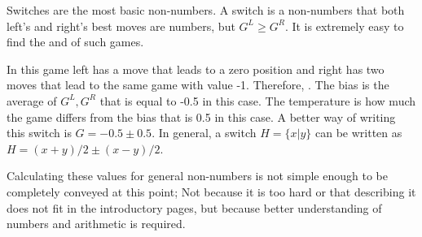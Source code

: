 Switches are the most basic non-numbers. A switch is a non-numbers \Gm{} that both left's and right's best moves are numbers, but $G^L \ge G^R$. It is extremely easy to find the  and  of such games. 

\begin{figure} [!ht]
	\begin{center}
	\end{center}
	\caption{}
\end{figure}

In this game left has a move that leads to a zero position and right has two moves that lead to the same game with value -1. Therefore, . The bias is the average of $G^L, G^R$ that is equal to -0.5 in this case. The temperature is how much the game differs from the bias that is 0.5 in this case. A better way of writing this switch is $G = -0.5 \pm 0.5$. In general, a switch $H = \{x| y\}$ can be written as $H = (x+y)/2 \pm (x-y)/2$.

Calculating these values for general non-numbers is not simple enough to be completely conveyed at this point; Not because it is too hard or that describing it does not fit in the introductory pages, but because better understanding of numbers and arithmetic is required.






